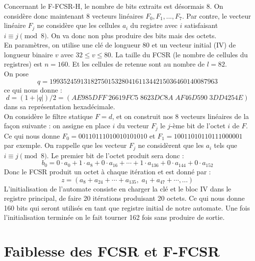 \documentclass[11pt]{report}
\begin{document}
Concernant le F-FCSR-H, le nombre de bits extraits est désormais 8. On considère donc maintenant 8 vecteurs linéaires $F_0,F_1,...,F_7$. Par contre, le vecteur linéaire $F_j$ ne considère que les cellules $a_i$ du registre avec $i$ satisfaisant $i \equiv j \pmod 8$. On va donc non plus produire des bits mais des octets. \\
En paramètres, on utilise une clé de longueur 80 et un vecteur initial (IV) de longueur binaire $v$ avec $32 \leq v \leq 80$. La taille du FCSR (le nombre de cellules du registres) est $n=160$. Et les cellules de retenue sont au nombre de $l = 82$.
\\
On pose
$$
q=1993524591318275015328041611344215036460140087963$$
ce qui nous donne : 
$$
d=(1+|q|)/2 = (AE985DFF\; 26619FC5\; 8623DC8A\; AF46D590\; 3DD4254E)$$
dans sa représentation hexadécimale. 
\\
On considère le filtre statique $F=d$, et on construit nos 8 vecteurs linéaires de la façon suivante : on assigne en place $i$ du vecteur $F_j$ le $j$-ème bit de l'octet $i$ de $F$.
\\
Ce qui nous donne $F_0 = 00110111010010101010$ et $F_1= 10011010110111000001$ par exemple. 
On rappelle que les vecteur $F_j$ ne considèrent que les $a_i$ tels que $i \equiv j \pmod 8$. Le premier bit de l'octet produit sera donc : 
$$
b_0 = 0 \cdot a_0 + 1 \cdot a_8 + 0 \cdot a_{16} + \cdots + 1 \cdot a_{136} + 0 \cdot a_{144} + 0 \cdot a_{152}
$$
Donc le FCSR produit un octet à chaque itération et est donné par :
$$
z= (a_8+a_{24}+\cdots + a_{135},\; a_1 + a_{47} + \cdots, ...)
$$
L'initialisation de l'automate consiste en charger la clé et le bloc IV dans le registre principal, de faire 20 itérations produisant 20 octets. Ce qui nous donne 160 bits qui seront utilisés en tant que registre initial de notre automate. Une fois l'initialisation terminée on le fait tourner 162 fois sans produire de sortie. 

\section{Faiblesse des FCSR et F-FCSR}
\end{document}
